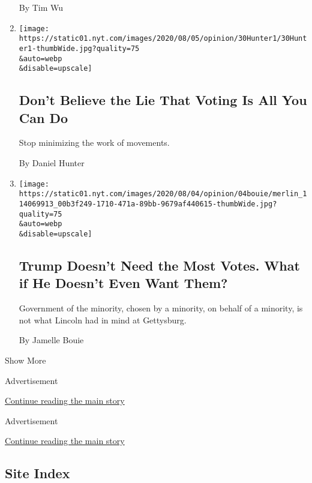 \begin{enumerate}
  By Tim Wu
\item
  \href{/2020/08/04/opinion/voting-2020-election-blm-movement.html}{}

  \texttt{[image: https://static01.nyt.com/images/2020/08/05/opinion/30Hunter1/30Hunter1-thumbWide.jpg?quality=75\\\&auto=webp\\\&disable=upscale]}

  \hypertarget{dont-believe-the-lie-that-voting-is-all-you-can-do}{%
  \subsection{Don't Believe the Lie That Voting Is All You Can
  Do}\label{dont-believe-the-lie-that-voting-is-all-you-can-do}}

  Stop minimizing the work of movements.

  By Daniel Hunter
\item
  \href{/2020/08/04/opinion/trump-2020-electoral-college.html}{}

  \texttt{[image: https://static01.nyt.com/images/2020/08/04/opinion/04bouie/merlin\_114069913\_00b3f249-1710-471a-89bb-9679af440615-thumbWide.jpg?quality=75\\\&auto=webp\\\&disable=upscale]}

  \hypertarget{trump-doesnt-need-the-most-votes-what-if-he-doesnt-even-want-them}{%
  \subsection{Trump Doesn't Need the Most Votes. What if He Doesn't Even
  Want
  Them?}\label{trump-doesnt-need-the-most-votes-what-if-he-doesnt-even-want-them}}

  Government of the minority, chosen by a minority, on behalf of a
  minority, is not what Lincoln had in mind at Gettysburg.

  By Jamelle Bouie
\end{enumerate}

Show More

Advertisement

\protect\hyperlink{after-mid1}{Continue reading the main story}

Advertisement

\protect\hyperlink{after-mktg}{Continue reading the main story}

\hypertarget{site-index}{%
\subsection{Site Index}\label{site-index}}

